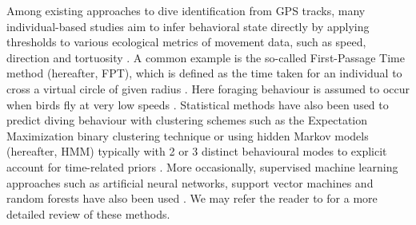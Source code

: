 \documentclass{article}
\begin{document}
Among existing approaches to dive identification from GPS tracks, many individual-based studies aim to infer behavioral state directly by applying thresholds to various ecological metrics of movement data, such as speed, direction and tortuosity \cite{dean_simultaneous_2015,seidel_ecological_2018}. A common example is the so-called First-Passage Time method (hereafter, FPT), which is defined as the time taken for an individual to cross a virtual circle of given radius \cite{carter_navigating_2016,pinaud_at-sea_2007,sommerfeld_foraging_2013}. Here foraging behaviour is assumed to occur when birds fly at very low speeds \cite{weimerskirch_foraging_2008}. Statistical methods have also been used to predict diving behaviour with clustering schemes such as the Expectation Maximization binary clustering technique \cite{mendez_geographical_2017,garriga_expectation-maximization_2016} or using hidden Markov models (hereafter, HMM) typically with 2 or 3 distinct behavioural modes to explicit account for time-related priors \cite{boyd_movement_2014,dunphy_seabirds_2020,mcclintock_momentuhmm_2018,oppel_foraging_2015}. More occasionally, supervised machine learning approaches such as artificial neural networks, support vector machines and random forests have also been used \cite{guilford_migration_2009, wang_machine_2019}. We may refer the reader to \cite{joo_navigating_2020} for a more detailed review of these methods.
\end{document}
